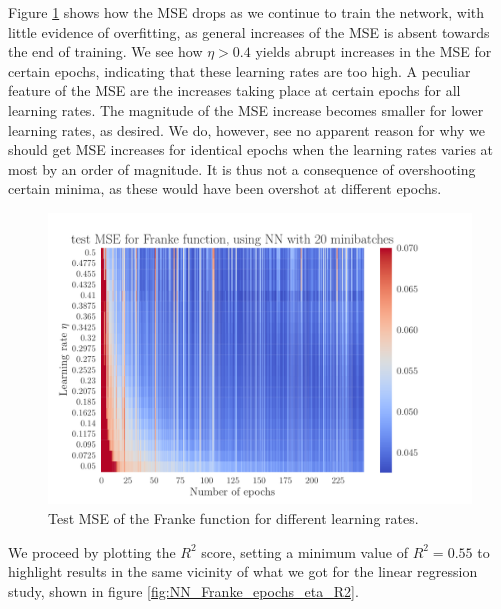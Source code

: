 \documentclass[12pt]{extarticle}
\begin{document}
Figure \ref{fig:NN_Franke_epochs_eta_MSE_limited} shows how the MSE drops as we continue to train the network, with little evidence of overfitting, as general increases of the MSE is absent towards the end of training. We see how $\eta>0.4$ yields abrupt increases in the MSE for certain epochs, indicating that these learning rates are too high. A peculiar feature of the MSE are the increases taking place at certain epochs for all learning rates. The magnitude of the MSE increase becomes smaller for lower learning rates, as desired. We do, however, see no apparent reason for why we should get MSE increases for identical epochs when the learning rates varies at most by an order of magnitude. It is thus not a consequence of overshooting certain minima, as these would have been overshot at different epochs.

\begin{figure}[h!]
	\includegraphics[width=\linewidth]{NN_Franke/NN_Franke__epochs_eta__test_MSE__582234.pdf}
	\caption{Test MSE of the Franke function for different learning rates.}
	\label{fig:NN_Franke_epochs_eta_MSE_limited}
\end{figure}


We proceed by plotting the $R^2$ score, setting a minimum value of $R^2=0.55$ to highlight results in the same vicinity of what we got for the linear regression study, shown in figure \ref{fig:NN_Franke_epochs_eta_R2}.
\end{document}
